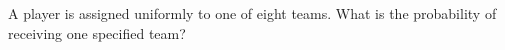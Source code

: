 A player is assigned uniformly to one of eight teams. What is the probability of receiving one specified team?

